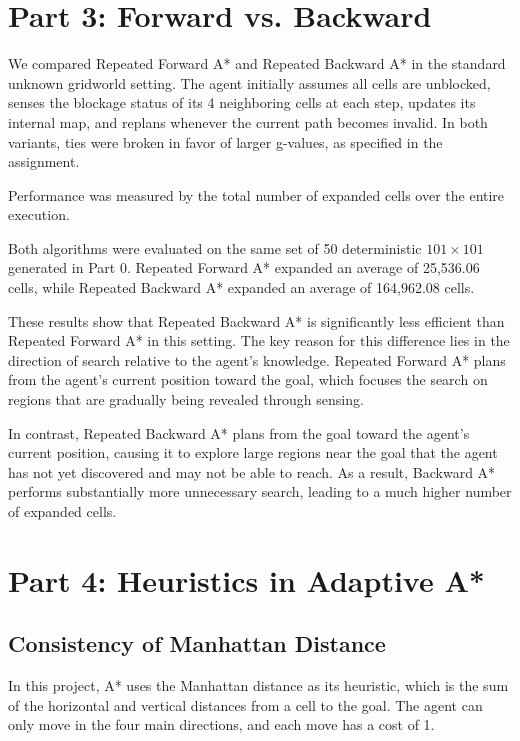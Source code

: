 \documentclass{article}
\begin{document}
\section{Part 3: Forward vs. Backward}

We compared Repeated Forward A* and Repeated Backward A* in the standard unknown gridworld setting. The agent initially assumes all cells are unblocked, senses the blockage status of its 4 neighboring cells at each step, updates its internal map, and replans whenever the current path becomes invalid. In both variants, ties were broken in favor of larger g-values, as specified in the assignment.

Performance was measured by the total number of expanded cells over the entire execution.

Both algorithms were evaluated on the same set of 50 deterministic $101 \times 101$  generated in Part 0. Repeated Forward A* expanded an average of 25,536.06 cells, while Repeated Backward A* expanded an average of 164,962.08 cells.

These results show that Repeated Backward A* is significantly less efficient than Repeated Forward A* in this setting. The key reason for this difference lies in the direction of search relative to the agent's knowledge. Repeated Forward A* plans from the agent's current position toward the goal, which focuses the search on regions that are gradually being revealed through sensing.

In contrast, Repeated Backward A* plans from the goal toward the agent's current position, causing it to explore large regions near the goal that the agent has not yet discovered and may not be able to reach. As a result, Backward A* performs substantially more unnecessary search, leading to a much higher number of expanded cells.

\section{Part 4: Heuristics in Adaptive A*}

\subsection{Consistency of Manhattan Distance}

In this project, A* uses the Manhattan distance as its heuristic, which is the sum of the horizontal and vertical distances from a cell to the goal. The agent can only move in the four main directions, and each move has a cost of 1.
\end{document}
